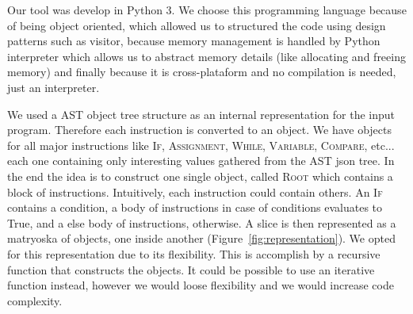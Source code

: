 Our tool was develop in Python 3. We choose this programming language because of being object oriented,
which allowed us to structured the code using design patterns such as visitor, because memory management
is handled by Python interpreter which allows us to abstract memory details (like allocating and freeing memory)
and finally because it is cross-plataform and no compilation is needed, just an interpreter.

We used a AST object tree structure as an internal representation for the input program. Therefore
each instruction is converted to an object. We have objects for all major instructions like \textsc{If},
\textsc{Assignment}, \textsc{While}, \textsc{Variable}, \textsc{Compare}, etc... each one containing
only interesting values gathered from the AST json tree.
In the end the idea is to construct one single object, called \textsc{Root} which contains a block of instructions.
Intuitively, each instruction could contain others. An \textsc{If} contains a condition, a body of instructions
in case of conditions evaluates to True, and a else body of instructions, otherwise. A slice is then represented
as a matryoska of objects, one inside another (Figure~\ref{fig:representation}). We opted for this representation due 
to its flexibility. This is accomplish by a recursive function that constructs the objects. It could be possible to use 
an iterative function instead, however we would loose flexibility and we would increase code complexity.

